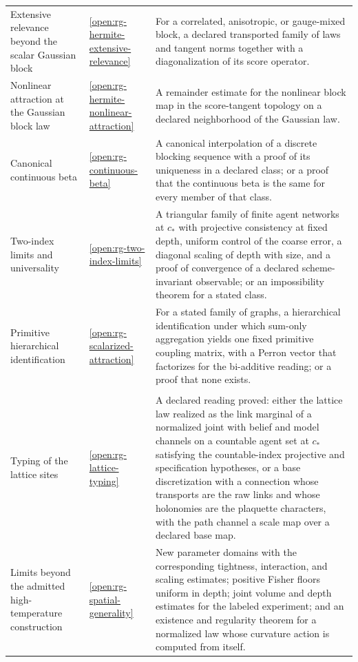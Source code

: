 {\begin{longtable}{@{}>{\raggedright\arraybackslash}p{}
>{\raggedright\arraybackslash}p{}
>{\raggedright\arraybackslash}p{}@{}}
Extensive relevance beyond the scalar Gaussian block & \cref{open:rg-hermite-extensive-relevance} & For a correlated, anisotropic, or gauge-mixed block, a declared transported family of laws and tangent norms together with a diagonalization of its score operator. \\
Nonlinear attraction at the Gaussian block law & \cref{open:rg-hermite-nonlinear-attraction} & A remainder estimate for the nonlinear block map in the score-tangent topology on a declared neighborhood of the Gaussian law. \\
Canonical continuous beta & \cref{open:rg-continuous-beta} & A canonical interpolation of a discrete blocking sequence with a proof of its uniqueness in a declared class; or a proof that the continuous beta is the same for every member of that class. \\
Two-index limits and universality & \cref{open:rg-two-index-limits} & A triangular family of finite agent networks at $c_*$ with projective consistency at fixed depth, uniform control of the coarse error, a diagonal scaling of depth with size, and a proof of convergence of a declared scheme-invariant observable; or an impossibility theorem for a stated class. \\
Primitive hierarchical identification & \cref{open:rg-scalarized-attraction} & For a stated family of graphs, a hierarchical identification under which sum-only aggregation yields one fixed primitive coupling matrix, with a Perron vector that factorizes for the bi-additive reading; or a proof that none exists. \\
\multicolumn{3}{@{}l}{\textbf{Part B-III: the lattice cluster}} \\
Typing of the lattice sites & \cref{open:rg-lattice-typing} & A declared reading proved: either the lattice law realized as the link marginal of a normalized joint with belief and model channels on a countable agent set at $c_*$ satisfying the countable-index projective and specification hypotheses, or a base discretization with a connection whose transports are the raw links and whose holonomies are the plaquette characters, with the path channel a scale map over a declared base map. \\
Limits beyond the admitted high-temperature construction & \cref{open:rg-spatial-generality} & New parameter domains with the corresponding tightness, interaction, and scaling estimates; positive Fisher floors uniform in depth; joint volume and depth estimates for the labeled experiment; and an existence and regularity theorem for a normalized law whose curvature action is computed from itself. \\

\end{longtable}}
